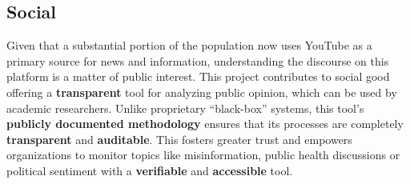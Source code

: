 \subsection{Social}

Given that a substantial portion of the population now uses YouTube as a primary source for news and information, understanding the discourse on this platform is a matter of public interest. This project contributes to social good offering a \textbf{transparent} tool for analyzing public opinion, which can be used by academic researchers. Unlike proprietary \enquote{black-box} systems, this tool's \textbf{publicly documented methodology} ensures that its processes are completely \textbf{transparent} and \textbf{auditable}. This fosters greater trust and empowers organizations to monitor topics like misinformation, public health discussions or political sentiment with a \textbf{verifiable} and \textbf{accessible} tool.
